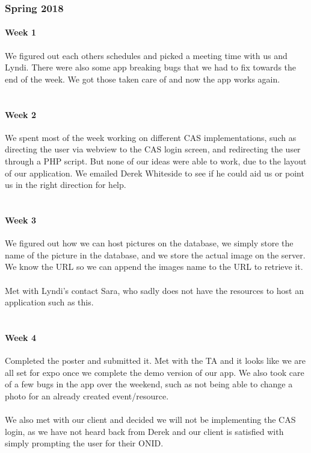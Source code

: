 \documentclass[onecolumn, draftclsnofoot,10pt, compsoc]{IEEEtran}
\begin{document}
    \subsubsection{Spring 2018}
      \paragraph{Week 1}
      We figured out each others schedules and picked a meeting time with us and Lyndi. There were also some app breaking bugs that we had to fix towards the end of the week. We got those taken care of and now the app works again. \\ \\

      \paragraph{Week 2}
      We spent most of the week working on different CAS implementations, such as directing the user via webview to the CAS login screen, and redirecting the user through a PHP script. But none of our ideas were able to work, due to the layout of our application. We emailed Derek Whiteside to see if he could aid us or point us in the right direction for help. \\ \\

      \paragraph{Week 3}
      We figured out how we can host pictures on the database, we simply store the name of the picture in the database, and we store the actual image on the server. We know the URL so we can append the images name to the URL to retrieve it. \\ \\
      Met with Lyndi's contact Sara, who sadly does not have the resources to host an application such as this. \\ \\

      \paragraph{Week 4}
      Completed the poster and submitted it. Met with the TA and it looks like we are all set for expo once we complete the demo version of our app. We also took care of a few bugs in the app over the weekend, such as not being able to change a photo for an already created event/resource. \\ \\
      We also met with our client and decided we will not be implementing the CAS login, as we have not heard back from Derek and our client is satisfied with simply prompting the user for their ONID. \\ \\
\end{document}
